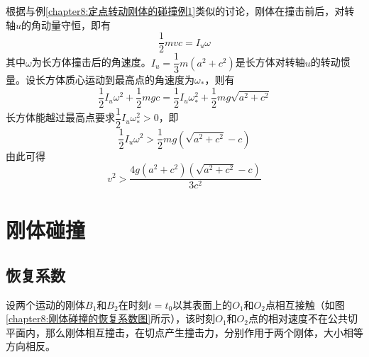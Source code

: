\begin{solution}
根据与例\ref{chapter8:定点转动刚体的碰撞例1}类似的讨论，刚体在撞击前后，对转轴$u$的角动量守恒，即有
\begin{equation*}
	\frac12 mvc = I_u\omega
\end{equation*}
其中$\omega$为长方体撞击后的角速度。$I_u=\dfrac13m(a^2+c^2)$是长方体对转轴$u$的转动惯量。设长方体质心运动到最高点的角速度为$\omega_*$，则有
\begin{equation*}
	\frac12I_u\omega^2+\frac12mgc=\frac12 I_u\omega_*^2+\frac12mg\sqrt{a^2+c^2}
\end{equation*}
长方体能越过最高点要求$\dfrac12 I_u\omega_*^2>0$，即
\begin{equation*}
	\frac12 I_u\omega^2 > \frac12mg(\sqrt{a^2+c^2}-c)
\end{equation*}
由此可得
\begin{equation*}
	v^2 > \frac{4g(a^2+c^2)(\sqrt{a^2+c^2}-c)}{3c^2}
\end{equation*}
\end{solution}

\section{刚体碰撞}

\subsection{恢复系数}

设两个运动的刚体$B_1$和$B_2$在时刻$t=t_0$以其表面上的$O_1$和$O_2$点相互接触（如图\ref{chapter8:刚体碰撞的恢复系数图}所示），该时刻$O_1$和$O_2$点的相对速度不在公共切平面内，那么刚体相互撞击，在切点产生撞击力，分别作用于两个刚体，大小相等方向相反。

